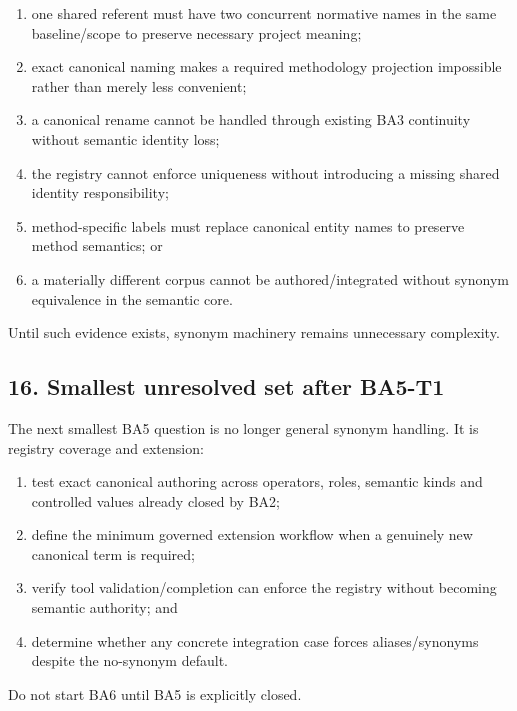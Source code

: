 \documentclass[
  10pt,
  a4paper,
]{article}
\providecommand{\tightlist}{%
  \setlength{\itemsep}{0pt}\setlength{\parskip}{0pt}}
\begin{document}
\begin{enumerate}
\def\labelenumi{\arabic{enumi}.}
\tightlist
\item
  one shared referent must have two concurrent normative names in the
  same baseline/scope to preserve necessary project meaning;
\item
  exact canonical naming makes a required methodology projection
  impossible rather than merely less convenient;
\item
  a canonical rename cannot be handled through existing BA3 continuity
  without semantic identity loss;
\item
  the registry cannot enforce uniqueness without introducing a missing
  shared identity responsibility;
\item
  method-specific labels must replace canonical entity names to preserve
  method semantics; or
\item
  a materially different corpus cannot be authored/integrated without
  synonym equivalence in the semantic core.
\end{enumerate}

Until such evidence exists, synonym machinery remains unnecessary
complexity.

\subsection{16. Smallest unresolved set after
BA5-T1}\label{smallest-unresolved-set-after-ba5-t1}

The next smallest BA5 question is no longer general synonym handling. It
is registry coverage and extension:

\begin{enumerate}
\def\labelenumi{\arabic{enumi}.}
\tightlist
\item
  test exact canonical authoring across operators, roles, semantic kinds
  and controlled values already closed by BA2;
\item
  define the minimum governed extension workflow when a genuinely new
  canonical term is required;
\item
  verify tool validation/completion can enforce the registry without
  becoming semantic authority; and
\item
  determine whether any concrete integration case forces
  aliases/synonyms despite the no-synonym default.
\end{enumerate}

Do not start BA6 until BA5 is explicitly closed.
\end{document}
